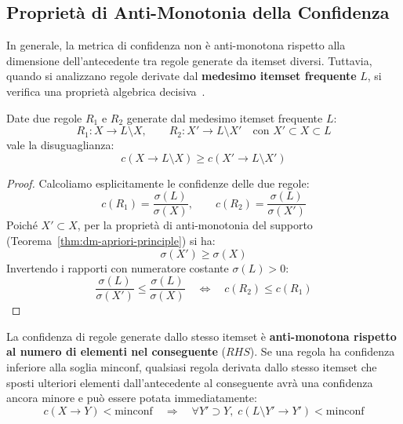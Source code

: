 \FloatBarrier
\subsection{Proprietà di Anti-Monotonia della Confidenza}
In generale, la metrica di confidenza non è anti-monotona rispetto alla dimensione dell'antecedente tra regole generate da itemset diversi. Tuttavia, quando si analizzano regole derivate dal \textbf{medesimo itemset frequente} $L$, si verifica una proprietà algebrica decisiva~\cite{tan2018}.

\begin{theorem}
\label{thm:dm-rule-confidence-pruning}
Date due regole $R_1$ e $R_2$ generate dal medesimo itemset frequente $L$:
\begin{equation}
R_1: X \longrightarrow L \setminus X, \qquad R_2: X' \longrightarrow L \setminus X' \quad \text{con } X' \subset X \subset L
\end{equation}
vale la disuguaglianza:
\begin{equation}
c(X \longrightarrow L \setminus X) \ge c(X' \longrightarrow L \setminus X')
\end{equation}
\end{theorem}

\begin{proof}
Calcoliamo esplicitamente le confidenze delle due regole:
\begin{equation}
c(R_1) = \frac{\sigma(L)}{\sigma(X)}, \qquad c(R_2) = \frac{\sigma(L)}{\sigma(X')}
\end{equation}
Poiché $X' \subset X$, per la proprietà di anti-monotonia del supporto (Teorema~\ref{thm:dm-apriori-principle}) si ha:
\begin{equation}
\sigma(X') \ge \sigma(X)
\end{equation}
Invertendo i rapporti con numeratore costante $\sigma(L) > 0$:
\begin{equation}
\frac{\sigma(L)}{\sigma(X')} \le \frac{\sigma(L)}{\sigma(X)} \quad \Longleftrightarrow \quad c(R_2) \le c(R_1)
\end{equation}
\end{proof}

\begin{corollary}
La confidenza di regole generate dallo stesso itemset è \textbf{anti-monotona rispetto al numero di elementi nel conseguente} ($RHS$).
Se una regola ha confidenza inferiore alla soglia $\mathrm{minconf}$, qualsiasi regola derivata dallo stesso itemset che sposti ulteriori elementi dall'antecedente al conseguente avrà una confidenza ancora minore e può essere potata immediatamente:
\begin{equation}
c(X \longrightarrow Y) < \mathrm{minconf} \quad \Longrightarrow \quad \forall Y' \supset Y, \; c(L \setminus Y' \longrightarrow Y') < \mathrm{minconf}
\end{equation}
\end{corollary}

